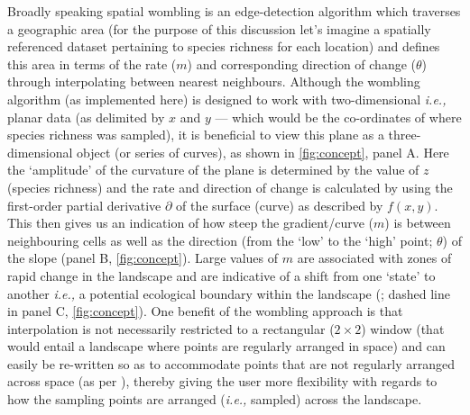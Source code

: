 Broadly speaking spatial wombling is an edge-detection algorithm which
traverses a geographic area (for the purpose of this discussion let's
imagine a spatially referenced dataset pertaining to species richness
for each location) and defines this area in terms of the rate ($m$)
and corresponding direction of change ($\theta$) through interpolating
between nearest neighbours. Although the wombling algorithm (as
implemented here) is designed to work with two-dimensional \emph{i.e.,}
planar data (as delimited by $x$ and $y$ --- which would be the
co-ordinates of where species richness was sampled), it is beneficial to
view this plane as a three-dimensional object (or series of curves), as
shown in \autoref{fig:concept}, panel A. Here the `amplitude' of the curvature of
the plane is determined by the value of $z$ (species richness) and the
rate and direction of change is calculated by using the first-order
partial derivative $\partial$ of the surface (curve) as described by
$f(x,y)$. This then gives us an indication of how steep the
gradient/curve ($m$) is between neighbouring cells as well as the
direction (from the `low' to the `high' point; $\theta$) of the slope
(panel B, \autoref{fig:concept}). Large values of $m$ are associated with zones
of rapid change in the landscape and are indicative of a shift from one
`state' to another \emph{i.e.,} a potential ecological boundary within
the landscape (\cite{Fortin2005SpaAna}; dashed line in panel C,
\autoref{fig:concept}). One benefit of the wombling approach is that
interpolation is not necessarily restricted to a rectangular
($2 \times 2$) window (that would entail a landscape where points are
regularly arranged in space) and can easily be re-written so as to
accommodate points that are not regularly arranged across space (as per
\cite{Fortin1994EdgDet}), thereby giving the user more flexibility with
regards to how the sampling points are arranged (\emph{i.e.,} sampled)
across the landscape.

